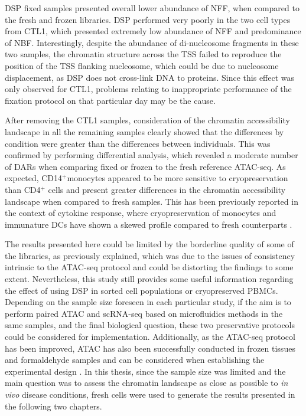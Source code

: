 DSP fixed samples presented overall lower abundance of NFF, when compared to the fresh and frozen libraries. DSP performed very poorly in the two cell types from CTL1, which presented extremely low abundance of NFF and predominance of NBF. Interestingly, despite the abundance of di-nucleosome fragments in these two samples, the chromatin structure across the TSS failed to reproduce the position of the TSS flanking nucleosome, which could be due to nucleosome displacement, as DSP does not cross-link DNA to proteins. Since this effect was only observed for CTL1, problems relating to inappropriate performance of the fixation protocol on that particular day may be the cause.

After removing the CTL1 samples, consideration of the chromatin accessibility landscape in all the remaining samples clearly showed that the differences by condition were greater than the differences between individuals. This was confirmed by performing differential analysis, which revealed a moderate number of DARs when comparing fixed or frozen to the fresh reference ATAC-seq. As expected, CD14$^+$monocytes appeared to be more sensitive to cryopreservation than CD4$^+$ cells and present greater differences in the chromatin accessibility landscape when compared to fresh samples. This has been previously reported in the context of cytokine response, where cryopreservation of monocytes and immunature DCs have shown a skewed profile compared to fresh counterparts \parencite{Meijerink2011}. 

The results presented here could be limited by the borderline quality of some of the libraries, as previously explained, which was due to the issues of consistency intrinsic to the ATAC-seq protocol and could be distorting the findings to some extent. Nevertheless, this study still provides some useful information regarding the effect of using DSP in sorted cell populations or cryopreserved PBMCs. Depending on the sample size foreseen in each particular study, if the aim is to perform paired ATAC and scRNA-seq based on microfluidics methods in the same samples, and the final biological question, these two preservative protocols could be considered for implementation. Additionally, as the ATAC-seq protocol has been improved, ATAC has also been successfully conducted in frozen tissues and formaldehyde samples and can be considered when establishing the experimental design \parencite{Corces2017, Chen2016}. In this thesis, since the sample size was limited and the main question was to assess the chromatin landscape as close as possible to \textit{in vivo} disease conditions, fresh cells were used to generate the results presented in the following two chapters.

